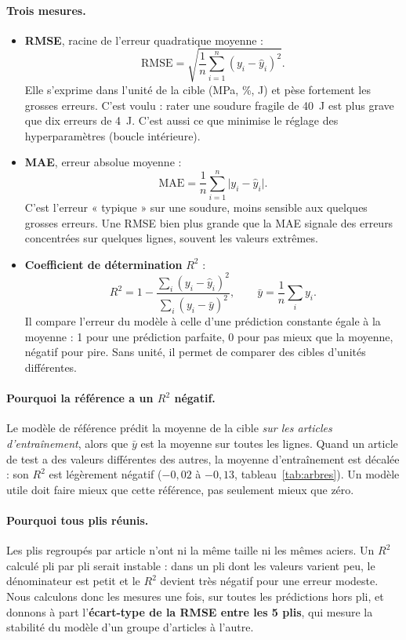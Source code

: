 \paragraph{Trois mesures.}
\begin{itemize}
  \item \textbf{RMSE}, racine de l'erreur quadratique moyenne :
    \[ \mathrm{RMSE} = \sqrt{\frac{1}{n}\sum_{i=1}^{n} (y_i - \hat y_i)^2}. \]
    Elle s'exprime dans l'unité de la cible (\si{\mega\pascal}, \%, \si{\joule}) et pèse
    fortement les grosses erreurs. C'est voulu : rater une soudure fragile de
    \SI{40}{\joule} est plus grave que dix erreurs de \SI{4}{\joule}. C'est aussi ce que
    minimise le réglage des hyperparamètres (boucle intérieure).
  \item \textbf{MAE}, erreur absolue moyenne :
    \[ \mathrm{MAE} = \frac{1}{n}\sum_{i=1}^{n} \lvert y_i - \hat y_i \rvert. \]
    C'est l'erreur « typique » sur une soudure, moins sensible aux quelques grosses
    erreurs. Une RMSE bien plus grande que la MAE signale des erreurs concentrées sur
    quelques lignes, souvent les valeurs extrêmes.
  \item \textbf{Coefficient de détermination} $R^2$ :
    \[ R^2 = 1 - \frac{\sum_{i} (y_i - \hat y_i)^2}{\sum_{i} (y_i - \bar y)^2},
       \qquad \bar y = \frac{1}{n}\sum_{i} y_i. \]
    Il compare l'erreur du modèle à celle d'une prédiction constante égale à la moyenne :
    1 pour une prédiction parfaite, 0 pour pas mieux que la moyenne, négatif pour pire. Sans
    unité, il permet de comparer des cibles d'unités différentes.
\end{itemize}

\paragraph{Pourquoi la référence a un $R^2$ négatif.} Le modèle de référence prédit la
moyenne de la cible \emph{sur les articles d'entraînement}, alors que $\bar y$ est la
moyenne sur toutes les lignes. Quand un article de test a des valeurs différentes des
autres, la moyenne d'entraînement est décalée : son $R^2$ est légèrement négatif ($-0{,}02$
à $-0{,}13$, tableau~\ref{tab:arbres}). Un modèle utile doit faire mieux que cette
référence, pas seulement mieux que zéro.

\paragraph{Pourquoi tous plis réunis.} Les plis regroupés par article n'ont ni la même
taille ni les mêmes aciers. Un $R^2$ calculé pli par pli serait instable : dans un pli dont
les valeurs varient peu, le dénominateur est petit et le $R^2$ devient très négatif pour
une erreur modeste. Nous calculons donc les mesures une fois, sur toutes les prédictions
hors pli, et donnons à part l'\textbf{écart-type de la RMSE entre les 5 plis}, qui mesure
la stabilité du modèle d'un groupe d'articles à l'autre.

